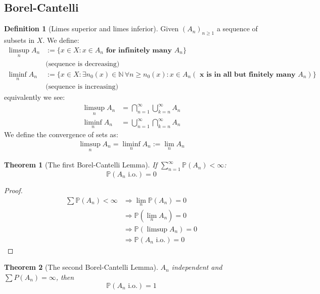 \documentclass[a4paper,11pt]{book}
\newtheorem{theorem}{Theorem}[section]
\theoremstyle{definition}
\newtheorem{definition}{Definition}[section]
\theoremstyle{remark}
\begin{document}
\subsection{Borel-Cantelli}
\begin{definition}[Limes superior and limes inferior]
	Given $(A_n)_{n \geq 1}$ a sequence of subsets in $X$. We define:
	\begin{align*}
		\limsup_n A_n &:= \{ x \in X: x \in A_n \textbf{ for infinitely many } A_n \}\\
		&\text{(sequence is decreasing)}\\
		\liminf_n A_n &:= \{ x \in X: \exists n_0(x) \in \mathbb{N}\,\forall n \geq n_0(x): x \in A_n ( \textbf{ x is in all but finitely many $A_n$})\}\\
		 &\text{(sequence is increasing)}
	\end{align*}
	equivalently we see:
	\begin{align*}
		\limsup_n A_n &= \bigcap_{n = 1}^\infty \bigcup_{k = n}^\infty A_n\\
		\liminf_n A_n &= \bigcup_{n = 1}^\infty \bigcap_{k = n}^\infty A_n
	\end{align*}
	We define the convergence of sets as:
	\begin{align*}
		\limsup_n A_n = \liminf_n A_n := \lim_n A_n
	\end{align*}
\end{definition}
\begin{theorem}[The first Borel-Cantelli Lemma]
	If $\sum_{n = 1}^\infty \mathbb{P}(A_n) < \infty$:
	\begin{equation*}
		\mathbb{P}(A_n \text{ i.o.}) = 0
	\end{equation*}
\end{theorem}
\begin{proof}
\begin{align*}
	\sum \mathbb{P}(A_n) < \infty &\Rightarrow \lim_n \mathbb{P}(A_n) = 0\\
	&\Rightarrow \mathbb{P}(\lim_n A_n) = 0\\
	&\Rightarrow \mathbb{P}(\limsup A_n) = 0\\
	&\Rightarrow \mathbb{P}(A_n \text{ i.o.}) = 0
\end{align*}
\end{proof}

\begin{theorem}[The second Borel-Cantelli Lemma]
	$A_n$ independent and $\sum P(A_n) = \infty$, then
	\begin{equation*}
		\mathbb{P}(A_n \text{ i.o.}) = 1
	\end{equation*}
\end{theorem}
\end{document}
